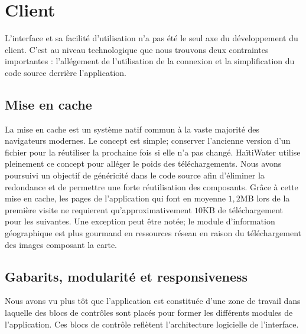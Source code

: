 \documentclass{EPL-master-thesis-covers-FR}
\begin{document}


		\section{Client}

			L'interface et sa facilité d'utilisation n'a pas été le seul axe du développement du client. C'est au niveau technologique que nous trouvons deux contraintes importantes : l'allégement de l'utilisation de la connexion et la simplification du code source derrière l'application.

			\subsection*{Mise en cache}
				\label{sec:cache_client}

				La mise en cache est un système natif commun à la vaste majorité des navigateurs modernes. Le concept est simple; conserver l'ancienne version d'un fichier pour la réutiliser la prochaine fois si elle n'a pas changé. HaïtiWater utilise pleinement ce concept pour alléger le poids des téléchargements. Nous avons poursuivi un objectif de généricité dans le code source afin d'éliminer la redondance et de permettre une forte réutilisation des composants. Grâce à cette mise en cache, les pages de l'application qui font en moyenne $1,2$MB lors de la première visite ne requierent qu'approximativement $10$KB de téléchargement pour les suivantes. Une exception peut être notée; le module d'information géographique est plus gourmand en ressources réseau en raison du téléchargement des images composant la carte.

			\subsection*{Gabarits, modularité et responsiveness}
				Nous avons vu plus tôt que l'application est constituée d'une zone de travail dans laquelle des blocs de contrôles sont placés pour former les différents modules de l'application. Ces blocs de contrôle reflètent l'architecture logicielle de l'interface.
\end{document}
